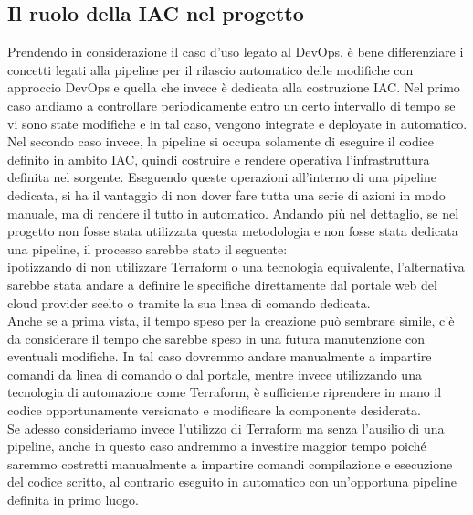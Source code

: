 \documentclass[a4paper,12pt]{report}
\begin{document}
\subsection{Il ruolo della IAC nel progetto}
Prendendo in considerazione il caso d'uso legato al DevOps, è bene differenziare i concetti legati alla pipeline per il rilascio automatico delle modifiche con approccio DevOps e quella che invece è dedicata alla costruzione IAC. Nel primo caso andiamo a controllare periodicamente entro un certo intervallo di tempo se vi sono state modifiche e in tal caso, vengono integrate e deployate in automatico.\\ Nel secondo caso invece, la pipeline si occupa solamente di eseguire il codice definito in ambito IAC, quindi costruire e rendere operativa l'infrastruttura definita nel sorgente. Eseguendo queste operazioni all'interno di una pipeline dedicata, si ha il vantaggio di non dover fare tutta una serie di azioni in modo manuale, ma di rendere il tutto in automatico. Andando più nel dettaglio, se nel progetto non fosse stata utilizzata questa metodologia e non fosse stata dedicata una pipeline, il processo sarebbe stato il seguente:\\
ipotizzando di non utilizzare Terraform o una tecnologia equivalente, l'alternativa sarebbe stata andare a definire le specifiche direttamente dal portale web del cloud provider scelto o tramite la sua linea di comando dedicata. \\
Anche se a prima vista, il tempo speso per la creazione può sembrare simile, c'è da considerare il tempo che sarebbe speso in una futura manutenzione con eventuali modifiche. In tal caso dovremmo andare manualmente a impartire comandi da linea di comando o dal portale, mentre invece utilizzando una tecnologia di automazione come Terraform, è sufficiente riprendere in mano il codice opportunamente versionato e modificare la componente desiderata.\\
Se adesso consideriamo invece l'utilizzo di Terraform ma senza l'ausilio di una pipeline, anche in questo caso andremmo a investire maggior tempo poiché saremmo costretti manualmente a impartire comandi compilazione e esecuzione del codice scritto, al contrario eseguito in automatico con un'opportuna pipeline definita in primo luogo. \\
\end{document}
